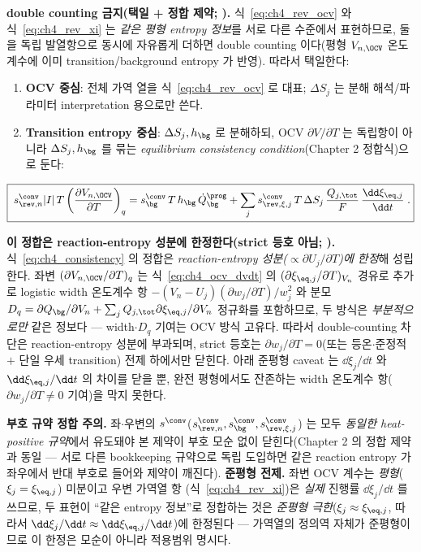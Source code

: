 \textbf{double counting 금지(택일 + 정합 제약; ).} 식~\eqref{eq:ch4_rev_ocv} 와 식~\eqref{eq:ch4_rev_xi}
는 \emph{같은 평형 entropy 정보}를 서로 다른 수준에서 표현하므로, 둘을 독립 발열항으로 동시에 자유롭게 더하면
double counting 이다(평형 $V_{n,\OCV}$ 온도계수에 이미 transition/background entropy 가 반영). 따라서 택일한다:
\begin{enumerate}[label=\Alph*),leftmargin=2.0em]
\item \textbf{OCV 중심}: 전체 가역 열을 식~\eqref{eq:ch4_rev_ocv} 로 대표; $\Delta S_j$ 는 분해 해석/파라미터
  interpretation 용으로만 쓴다.
\item \textbf{Transition entropy 중심}: $\Delta S_j,h_\bg$ 로 분해하되, OCV $\partial V/\partial T$ 는 독립항이
  아니라 $\Delta S_j,h_\bg$ 를 묶는 \emph{equilibrium consistency condition}(Chapter 2 정합식)으로 둔다:
\end{enumerate}
\begin{equation}
\boxed{\;s_{\rev,n}^{\conv}|I|\,T\left(\frac{\partial V_{n,\OCV}}{\partial T}\right)_q
=s_\bg^{\conv}\,T\,h_\bg\,\dot Q_\bg^{\prog}
+\sum_j s_{\rev,\xi,j}^{\conv}\,T\,\Delta S_j\,\frac{Q_{j,\tot}}{F}\,\frac{\dd\xi_{\eq,j}}{\dd t}\;.}
\label{eq:ch4_consistency}
\end{equation}
\begin{boundbox}
\textbf{이 정합은 reaction-entropy 성분에 한정한다(strict 등호 아님; ).} 식~\eqref{eq:ch4_consistency} 의
정합은 \emph{reaction-entropy 성분($\propto\partial U_j/\partial T$)에 한정}해 성립한다. 좌변
$(\partial V_{n,\OCV}/\partial T)_q$ 는 식~\eqref{eq:ch4_ocv_dvdt} 의 $(\partial\xi_{\eq,j}/\partial T)_{V_n}$ 경유로
추가로 logistic width 온도계수 항 $-(V_n-U_j)(\partial w_j/\partial T)/w_j^2$ 와 분모 $D_q=\partial Q_\bg/\partial V_n
+\sum_j Q_{j,\tot}\partial\xi_{\eq,j}/\partial V_n$ 정규화를 포함하므로, 두 방식은 \emph{부분적으로만} 같은
정보다 — width$\cdot D_q$ 기여는 OCV 방식 고유다. 따라서 double-counting 차단은 reaction-entropy 성분에
부과되며, strict 등호는 $\partial w_j/\partial T=0$(또는 등온$\cdot$준정적 $+$ 단일 우세 transition) 전제 하에서만
닫힌다. 아래 준평형 caveat 는 $\dd\xi_j/\dd t$ 와 $\dd\xi_{\eq,j}/\dd t$ 의 차이를 닫을 뿐, 완전 평형에서도
잔존하는 width 온도계수 항($\partial w_j/\partial T\ne0$ 기여)을 막지 못한다.
\end{boundbox}
\textbf{부호 규약 정합 주의.} 좌$\cdot$우변의 $s^{\conv}$($s_{\rev,n}^{\conv},s_\bg^{\conv},s_{\rev,\xi,j}^{\conv}$)
는 모두 \emph{동일한 heat-positive 규약}에서 유도돼야 본 제약이 부호 모순 없이 닫힌다(Chapter 2 의 정합 제약과
동일 — 서로 다른 bookkeeping 규약으로 독립 도입하면 같은 reaction entropy 가 좌우에서 반대 부호로 들어와 제약이
깨진다). \textbf{준평형 전제.} 좌변 OCV 계수는 \emph{평형}($\xi_j=\xi_{\eq,j}$) 미분이고 우변 가역열 항
(식~\eqref{eq:ch4_rev_xi})은 \emph{실제} 진행률 $\dd\xi_j/\dd t$ 를 쓰므로, 두 표현이 ``같은 entropy 정보''로
정합하는 것은 \emph{준평형 극한}($\xi_j\approx\xi_{\eq,j}$, 따라서 $\dd\xi_j/\dd t\approx\dd\xi_{\eq,j}/\dd t$)에
한정된다 — 가역열의 정의역 자체가 준평형이므로 이 한정은 모순이 아니라 적용범위 명시다.

